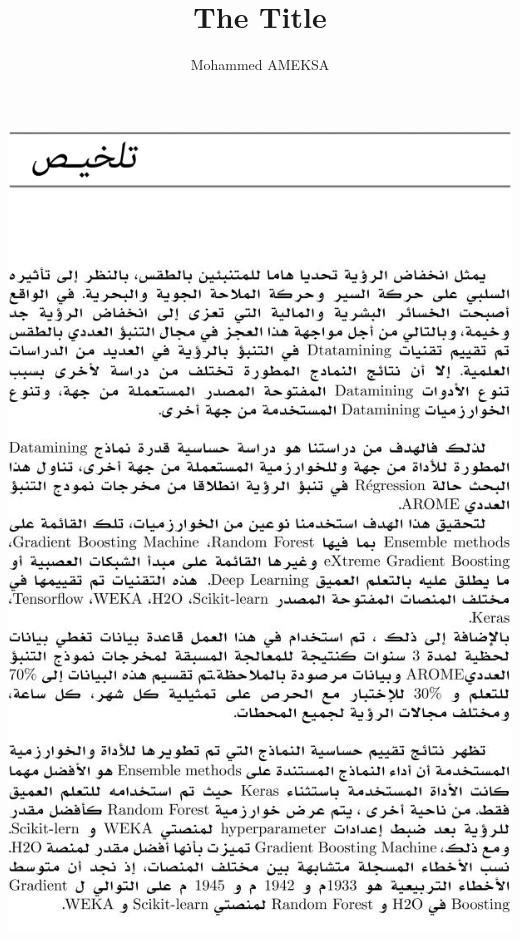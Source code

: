 \documentclass[a4paper,twoside,12pt]{book}
\begin{document}
\frontmatter
\pagestyle{fancyempty}

 \title{The Title}
 \author{Mohammed AMEKSA}



\begin{titlepage}


\end{titlepage}

\thispagestyle{empty}

\newpage

\dominitoc



\setcounter{page}{1}

\let\cleardoublepage\clearpage

\let\cleardoublepage\clearpage

\let\cleardoublepage\clearpage

\let\cleardoublepage\clearpage
\newpage
{}
\includegraphics[width=14cm]{img/abstract_ar.png}
\let\cleardoublepage\clearpage

\let\cleardoublepage\clearpage
\setcounter{secnumdepth}{3}
\setcounter{tocdepth}{2}
\markboth{}{}
\tableofcontents
\markboth{}{}
\end{document}
